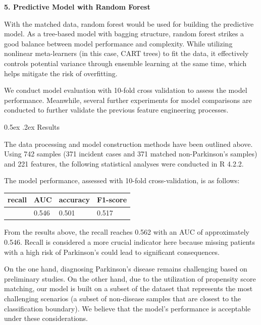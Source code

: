\documentclass[12pt,]{article}
\makeatletter
\renewcommand\subsection{
  \@startsection{subsection}{2}{\z@}
    {-1.5ex\@plus -1ex \@minus -.2ex}%
    {0.5ex \@plus .2ex}%
    {\normalfont\normalsize\bf}} %
\makeatother
\begin{document}
\begin{enumerate}
  \textbf{5. Predictive Model with Random Forest}

  With the matched data, random forest would be used for building the
  predictive model. As a tree-based model with bagging structure, random
  forest strikes a good balance between model performance and
  complexity. While utilizing nonlinear meta-learners (in this case,
  CART trees) to fit the data, it effectively controls potential
  variance through ensemble learning at the same time, which helps
  mitigate the risk of overfitting.

  We conduct model evaluation with 10-fold cross validation to assess
  the model performance. Meanwhile, several further experiments for
  model comparisons are conducted to further validate the previous
  feature engineering processes.
\end{enumerate}

\hypertarget{results-1}{%
\subsection{Results}\label{results-1}}

The data processing and model construction methods have been outlined
above. Using 742 samples (371 incident cases and 371 matched
non-Parkinson's samples) and 221 features, the following statistical
analyses were conducted in R 4.2.2.

The model performance, assessed with 10-fold cross-validation, is as
follows:

\begin{longtable}[]{@{}llll@{}}
\toprule\noalign{}
recall & AUC & accuracy & F1-score \\
\midrule\noalign{}
\endhead
\bottomrule\noalign{}
\endlastfoot
0.562 & 0.546 & 0.501 & 0.517 \\
\end{longtable}

From the results above, the recall reaches 0.562 with an AUC of
approximately 0.546. Recall is considered a more crucial indicator here
because missing patients with a high risk of Parkinson's could lead to
significant consequences.

On the one hand, diagnosing Parkinson's disease remains challenging
based on preliminary studies. On the other hand, due to the utilization
of propensity score matching, our model is built on a subset of the
dataset that represents the most challenging scenarios (a subset of
non-disease samples that are closest to the classification boundary). We
believe that the model's performance is acceptable under these
considerations.
\end{document}
